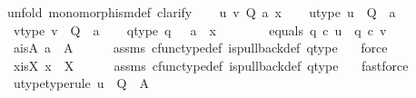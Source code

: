 \begin{isabellebody}
{\isacharparenleft}{\kern0pt}unfold\ monomorphism{\isacharunderscore}{\kern0pt}def{}{\isacharcomma}{\kern0pt}\ clarify{\isacharparenright}{\kern0pt}\isanewline
\ \ \isamarkupfalse%
\ u\ v\ Q\ a\ x\isanewline
\ \ \isamarkupfalse%
\ u{\isacharunderscore}{\kern0pt}type{\isacharcolon}{\kern0pt}\ {\isachardoublequoteopen}u\ {\isacharcolon}{\kern0pt}\ Q\ {\isasymrightarrow}\ a{\isachardoublequoteclose}\ \ \isanewline
\ \ \isamarkupfalse%
\ v{\isacharunderscore}{\kern0pt}type{\isacharcolon}{\kern0pt}\ {\isachardoublequoteopen}v\ {\isacharcolon}{\kern0pt}\ Q\ {\isasymrightarrow}\ a{\isachardoublequoteclose}\isanewline
\ \ \isamarkupfalse%
\ q{}{\isacharunderscore}{\kern0pt}type{\isacharcolon}{\kern0pt}\ {\isachardoublequoteopen}q{}\ {\isacharcolon}{\kern0pt}\ \ a\ {\isasymrightarrow}\ x{\isachardoublequoteclose}\ \ \ \ \isanewline
\ \ \isamarkupfalse%
\ equals{\isacharcolon}{\kern0pt}\ {\isachardoublequoteopen}q{}\ {\isasymcirc}\isactrlsub c\ u\ {\isacharequal}{\kern0pt}\ q{}\ {\isasymcirc}\isactrlsub c\ v{\isachardoublequoteclose}\ \isanewline
\isanewline
\ \ \isamarkupfalse%
\ a{\isacharunderscore}{\kern0pt}is{\isacharunderscore}{\kern0pt}A{\isacharcolon}{\kern0pt}\ {\isachardoublequoteopen}a\ {\isacharequal}{\kern0pt}\ A{\isachardoublequoteclose}\isanewline
\ \ \ \ \isamarkupfalse%
\ assms{\isacharparenleft}{\kern0pt}{}{\isacharparenright}{\kern0pt}\ cfunc{\isacharunderscore}{\kern0pt}type{\isacharunderscore}{\kern0pt}def\ is{\isacharunderscore}{\kern0pt}pullback{\isacharunderscore}{\kern0pt}def\ q{}{\isacharunderscore}{\kern0pt}type\ \ \isamarkupfalse%
\ force\isanewline
\ \ \isamarkupfalse%
\ x{\isacharunderscore}{\kern0pt}is{\isacharunderscore}{\kern0pt}X{\isacharcolon}{\kern0pt}\ {\isachardoublequoteopen}x\ {\isacharequal}{\kern0pt}\ X{\isachardoublequoteclose}\isanewline
\ \ \ \ \isamarkupfalse%
\ assms{\isacharparenleft}{\kern0pt}{}{\isacharparenright}{\kern0pt}\ cfunc{\isacharunderscore}{\kern0pt}type{\isacharunderscore}{\kern0pt}def\ is{\isacharunderscore}{\kern0pt}pullback{\isacharunderscore}{\kern0pt}def\ q{}{\isacharunderscore}{\kern0pt}type\ \ \isamarkupfalse%
\ fastforce\isanewline
\ \ \isamarkupfalse%
\ u{\isacharunderscore}{\kern0pt}type{}{\isacharbrackleft}{\kern0pt}type{\isacharunderscore}{\kern0pt}rule{\isacharbrackright}{\kern0pt}{\isacharcolon}{\kern0pt}\ {\isachardoublequoteopen}u\ {\isacharcolon}{\kern0pt}\ Q\ {\isasymrightarrow}\ A{\isachardoublequoteclose}\isanewline

\end{isabellebody}
